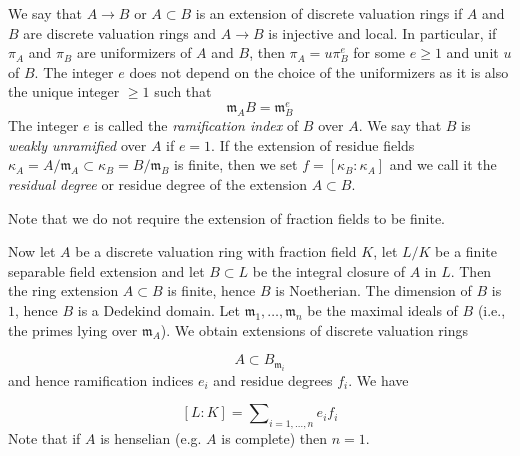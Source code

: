 \begin{definition}[\stackstag{09E4}]\label{definition:weakly_unramified_and_tamely_ramified_DVR}
    We say that $A \to B$ or $A \subset B$ is an extension of discrete valuation rings if $A$ and $B$ are discrete valuation rings and $A \to B$ is injective and local. In particular, if $\pi _ A$ and $\pi _ B$ are uniformizers of $A$ and $B$, then $\pi _ A = u \pi _ B^ e$ for some $e \geq 1$ and unit $u$ of $B$. The integer $e$ does not depend on the choice of the uniformizers as it is also the unique integer $\geq 1$ such that
\[ \mathfrak m_ A B = \mathfrak m_ B^ e \]
The integer $e$ is called the \textit{ramification index} of $B$ over $A$. We say that $B$ is \textit{weakly unramified} over $A$ if $e = 1$.
If the extension of residue fields $\kappa _ A = A/\mathfrak m_ A \subset \kappa _ B = B/\mathfrak m_ B$ is finite,
then we set $f = [\kappa _ B : \kappa _ A]$ and we call it the \textit{residual degree} or residue degree of the extension $A \subset B$.

Note that we do not require the extension of fraction fields to be finite.
\end{definition}

Now let $A$ be a discrete valuation ring with fraction field $K$, let  $L/K$ be a finite separable field extension and
let $B \subset L$ be the integral closure of $A$ in $L$.
Then the ring extension $A \subset B$ is finite, hence $B$ is Noetherian.
The dimension of $B$ is $1$, hence $B$ is a Dedekind domain.
Let $\mathfrak m_1, \ldots , \mathfrak m_ n$ be the maximal ideals of $B$ (i.e., the primes lying over $\mathfrak m_ A$).
We obtain extensions of discrete valuation rings

\[ A \subset B_{\mathfrak m_ i} \]
and hence ramification indices $e_ i$ and residue degrees $f_ i$. We have

\[ [L : K] = \sum \nolimits _{i = 1, \ldots , n} e_ i f_ i \]
Note that if $A$ is henselian (e.g. $A$ is complete) then $n=1$.

